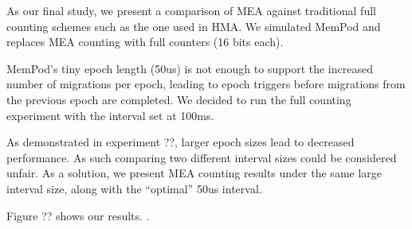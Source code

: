 As our final study, we present a comparison of MEA against traditional full counting schemes such as the one used in HMA. We simulated MemPod and replaces MEA counting with full counters (16 bits each). 

MemPod's tiny epoch length (50us) is not enough to support the increased number of migrations per epoch, leading to epoch triggers before migrations from the previous epoch are completed. We decided to run the full counting experiment with the interval set at 100ms.

As demonstrated in experiment ??, larger epoch sizes lead to decreased performance. As such comparing two different interval sizes could be considered unfair. As a solution, we present MEA counting results under the same large interval size, along with the ``optimal'' 50us interval. 

Figure ?? shows our results. .




